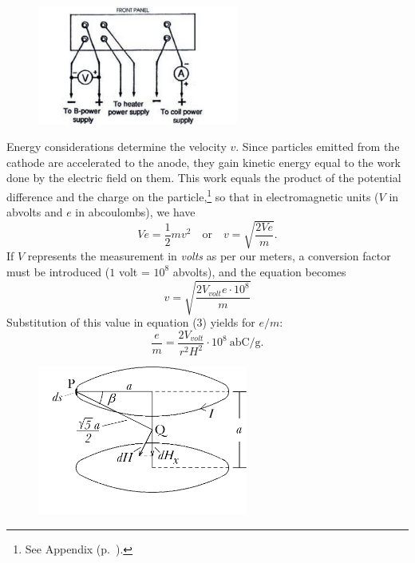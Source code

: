 \begin{figure}[h]
  \begin{center}
    \includegraphics[width=2.59in,height=1.53667in]{images/02_thomson/power-supply.png}
  \end{center}
\end{figure}



Energy considerations determine the velocity $v$. Since particles
emitted from the cathode are accelerated to the anode, they gain kinetic
energy equal to the work done by the electric field on them. This work
equals the product of the potential difference and the charge on the
particle,\footnote{See Appendix (p.~\pageref{ch:appendix}).} so that in electromagnetic
units ($V$ in abvolts and $e$ in abcoulombs), we have
%
\begin{equation}
Ve = \frac{1}{2}mv^2 \quad\text{or}\quad v = \sqrt{\frac{2Ve}{m}}.\label{eq:Ve/v_thomson}
\end{equation}
%
If $V$ represents the measurement in \emph{volts} as per our
meters, a conversion factor must be introduced ($1$ volt = $10^8$ abvolts),
and the equation becomes
\begin{equation}\tag{5}
v = \sqrt{\frac{2V_{volt}e\cdot{10^8}}{m}}
\end{equation}
Substitution of this value in equation (3) yields for $e/m$:
\begin{equation}\tag{6}
\frac{e}{m} = \frac{2V_{volt}}{r^2H^2}\cdot 10^8 \:\text{abC/g.}
\end{equation}

\begin{figure}
  \begin{center}
    \includegraphics[width=2.72153in,height=1.93056in]{images/02_thomson/image039.png}
  \end{center}
\end{figure}

